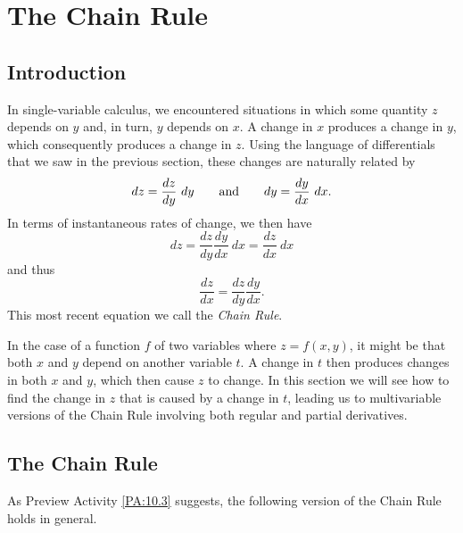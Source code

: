 \section{The Chain Rule} \label{S:10.5.Chain_Rule}

\vspace*{-14 pt}


\subsection*{Introduction}

In single-variable calculus, we encountered situations in
which some quantity $z$ depends on $y$ and, in turn, $y$ depends on
$x$.  A change in $x$ produces a change in $y$, which consequently
produces a change in $z$.  Using the language of differentials that we saw
in the previous section, these changes are naturally related by
$$
dz = \frac{dz}{dy}~dy 
\hspace*{20pt}
\mbox{and}
\hspace*{20pt}
dy = \frac{dy}{dx}~dx.
$$
In terms of instantaneous rates of change, we then have
$$
dz = \frac{dz}{dy}\frac{dy}{dx}~dx = \frac{dz}{dx}~dx
$$
and thus
$$
\frac{dz}{dx} = \frac{dz}{dy}\frac{dy}{dx}.
$$
This most recent equation we call the {\em Chain Rule}.

In the case of a function $f$ of two variables where $z = f(x,y)$, it might be that both $x$ and $y$ depend on another variable $t$. A change in $t$ then produces changes in both $x$ and $y$, which then cause $z$ to change. In this section we will see how to find the change in $z$ that is caused by a change in $t$, leading us to multivariable versions of the Chain Rule involving both regular and partial derivatives. 



\subsection*{The Chain Rule}

As Preview Activity \ref{PA:10.3} suggests, the following version of the Chain Rule holds in general.

